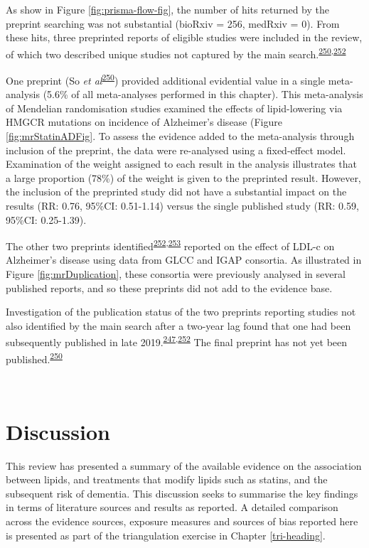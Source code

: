 \documentclass[a4paper, twoside]{templates/ociamthesis}
\begin{document}
As show in Figure \ref{fig:prisma-flow-fig}, the number of hits returned by the preprint searching was not substantial (bioRxiv = 256, medRxiv = 0). From these hits, three preprinted reports of eligible studies were included in the review, of which two described unique studies not captured by the main search.\textsuperscript{\protect\hyperlink{ref-so2017}{250},\protect\hyperlink{ref-andrews2019}{252}}

One preprint (So \emph{et al}\textsuperscript{\protect\hyperlink{ref-so2017}{250}}) provided additional evidential value in a single meta-analysis (5.6\% of all meta-analyses performed in this chapter). This meta-analysis of Mendelian randomisation studies examined the effects of lipid-lowering via HMGCR mutations on incidence of Alzheimer's disease (Figure \ref{fig:mrStatinADFig}. To assess the evidence added to the meta-analysis through inclusion of the preprint, the data were re-analysed using a fixed-effect model. Examination of the weight assigned to each result in the analysis illustrates that a large proportion (78\%) of the weight is given to the preprinted result. However, the inclusion of the preprinted study did not have a substantial impact on the results (RR: 0.76, 95\%CI: 0.51-1.14) versus the single published study (RR: 0.59, 95\%CI: 0.25-1.39).

The other two preprints identified\textsuperscript{\protect\hyperlink{ref-andrews2019}{252},\protect\hyperlink{ref-zhu2017}{253}} reported on the effect of LDL-c on Alzheimer's disease using data from GLCC and IGAP consortia. As illustrated in Figure \ref{fig:mrDuplication}, these consortia were previously analysed in several published reports, and so these preprints did not add to the evidence base.

Investigation of the publication status of the two preprints reporting studies not also identified by the main search after a two-year lag found that one had been subsequently published in late 2019.\textsuperscript{\protect\hyperlink{ref-andrews2021}{247},\protect\hyperlink{ref-andrews2019}{252}} The final preprint has not yet been published.\textsuperscript{\protect\hyperlink{ref-so2017}{250}}

~

\hypertarget{discussion-1}{%
\section{Discussion}\label{discussion-1}}

This review has presented a summary of the available evidence on the association between lipids, and treatments that modify lipids such as statins, and the subsequent risk of dementia. This discussion seeks to summarise the key findings in terms of literature sources and results as reported. A detailed comparison across the evidence sources, exposure measures and sources of bias reported here is presented as part of the triangulation exercise in Chapter \ref{tri-heading}.
\end{document}

